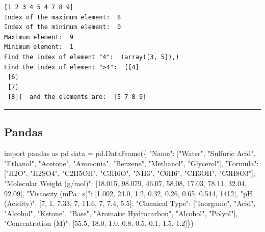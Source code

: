 \documentclass[
  letterpaper,
  DIV=11,
  numbers=noendperiod]{scrreprt}
\newenvironment{Shaded}{\begin{snugshade}}{\end{snugshade}}
\newcommand{\DecValTok}[1]{\textcolor[rgb]{0.68,0.00,0.00}{#1}}
\newcommand{\FloatTok}[1]{\textcolor[rgb]{0.68,0.00,0.00}{#1}}
\newcommand{\ImportTok}[1]{\textcolor[rgb]{0.00,0.46,0.62}{#1}}
\newcommand{\NormalTok}[1]{\textcolor[rgb]{0.00,0.23,0.31}{#1}}
\newcommand{\OperatorTok}[1]{\textcolor[rgb]{0.37,0.37,0.37}{#1}}
\newcommand{\StringTok}[1]{\textcolor[rgb]{0.13,0.47,0.30}{#1}}
\begin{document}
\begin{verbatim}
[1 2 3 4 5 4 7 8 9]
Index of the maximum element:  8
Index of the minimum element:  0
Maximum element:  9
Minimum element:  1
Find the index of element "4":  (array([3, 5]),)
Find the index of element ">4":  [[4]
 [6]
 [7]
 [8]]  and the elements are:  [5 7 8 9]
\end{verbatim}

\begin{center}\rule{0.5\linewidth}{0.5pt}\end{center}

\subsection*{Pandas}\label{pandas-4}

\begin{Shaded}
\begin{Highlighting}[]
\ImportTok{import}\NormalTok{ pandas }\ImportTok{as}\NormalTok{ pd}
\NormalTok{data }\OperatorTok{=}\NormalTok{ pd.DataFrame(\{}
    \StringTok{"Name"}\NormalTok{: [}\StringTok{"Water"}\NormalTok{, }\StringTok{"Sulfuric Acid"}\NormalTok{, }\StringTok{"Ethanol"}\NormalTok{, }\StringTok{"Acetone"}\NormalTok{, }\StringTok{"Ammonia"}\NormalTok{, }\StringTok{"Benzene"}\NormalTok{, }\StringTok{"Methanol"}\NormalTok{, }\StringTok{"Glycerol"}\NormalTok{],}
    \StringTok{"Formula"}\NormalTok{: [}\StringTok{"H2O"}\NormalTok{, }\StringTok{"H2SO4"}\NormalTok{, }\StringTok{"C2H5OH"}\NormalTok{, }\StringTok{"C3H6O"}\NormalTok{, }\StringTok{"NH3"}\NormalTok{, }\StringTok{"C6H6"}\NormalTok{, }\StringTok{"CH3OH"}\NormalTok{, }\StringTok{"C3H8O3"}\NormalTok{],}
    \StringTok{"Molecular Weight (g/mol)"}\NormalTok{: [}\FloatTok{18.015}\NormalTok{, }\FloatTok{98.079}\NormalTok{, }\FloatTok{46.07}\NormalTok{, }\FloatTok{58.08}\NormalTok{, }\FloatTok{17.03}\NormalTok{, }\FloatTok{78.11}\NormalTok{, }\FloatTok{32.04}\NormalTok{, }\FloatTok{92.09}\NormalTok{],}
    \StringTok{"Viscosity (mPa·s)"}\NormalTok{: [}\FloatTok{1.002}\NormalTok{, }\FloatTok{24.0}\NormalTok{, }\FloatTok{1.2}\NormalTok{, }\FloatTok{0.32}\NormalTok{, }\FloatTok{0.26}\NormalTok{, }\FloatTok{0.65}\NormalTok{, }\FloatTok{0.544}\NormalTok{, }\DecValTok{1412}\NormalTok{],}
    \StringTok{"pH (Acidity)"}\NormalTok{: [}\DecValTok{7}\NormalTok{, }\DecValTok{1}\NormalTok{, }\FloatTok{7.33}\NormalTok{, }\DecValTok{7}\NormalTok{, }\FloatTok{11.6}\NormalTok{, }\DecValTok{7}\NormalTok{, }\FloatTok{7.4}\NormalTok{, }\FloatTok{5.5}\NormalTok{],}
    \StringTok{"Chemical Type"}\NormalTok{: [}\StringTok{"Inorganic"}\NormalTok{, }\StringTok{"Acid"}\NormalTok{, }\StringTok{"Alcohol"}\NormalTok{, }\StringTok{"Ketone"}\NormalTok{, }\StringTok{"Base"}\NormalTok{, }\StringTok{"Aromatic Hydrocarbon"}\NormalTok{, }\StringTok{"Alcohol"}\NormalTok{, }\StringTok{"Polyol"}\NormalTok{],}
    \StringTok{"Concentration (M)"}\NormalTok{: [}\FloatTok{55.5}\NormalTok{, }\FloatTok{18.0}\NormalTok{, }\FloatTok{1.0}\NormalTok{, }\FloatTok{0.8}\NormalTok{, }\FloatTok{0.5}\NormalTok{, }\FloatTok{0.1}\NormalTok{, }\FloatTok{1.5}\NormalTok{, }\FloatTok{1.2}\NormalTok{]\})}
\end{Highlighting}
\end{Shaded}
\end{document}

